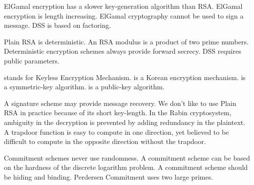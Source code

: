 \documentclass[11pt,a4paper]{report}
\begin{document}
{ElGamal encryption has a slower key-generation algorithm than RSA.}
{ElGamal encryption is length increasing.}
{ElGamal cryptography cannot be used to sign a message.}
{DSS is based on factoring.}

 {Plain RSA is deterministic.}
 {An RSA modulus is a product of two prime numbers.}
 {Deterministic encryption schemes always provide forward secrecy.}
 {DSS requires public parameters.}
 
 		{stands for Keyless Encryption Mechanism.}
    {is a Korean encryption mechanism.}
 {is a symmetric-key algorithm.}
 {is a public-key algorithm.}
  
{A signature scheme may provide message recovery.}
      {We don't like to use Plain RSA in practice because of its short key-length.}		
	 	{In the Rabin cryptosystem, ambiguity in the decryption is prevented by adding redundancy in the plaintext.}
{A trapdoor function is easy to compute in one direction, yet believed to be
difficult to compute in the opposite direction without the trapdoor.}


 {Commitment schemes never use randomness.}
      {A commitment scheme can be based on the hardness of the discrete logarithm problem.}
 {A commitment scheme should be hiding and binding.}
 {Perdersen Commitment uses two large primes.}
\end{document}
